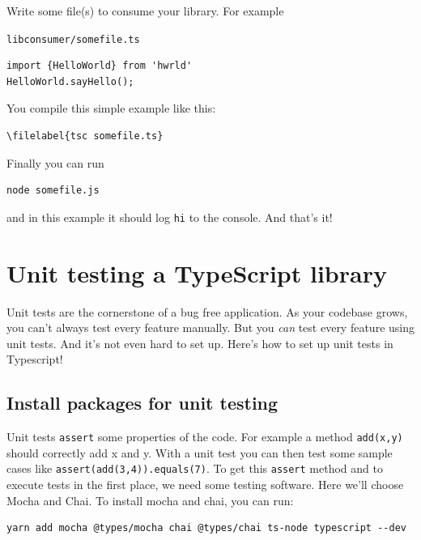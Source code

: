 \documentclass[12pt,a4paper]{article}
\newcommand{\filelabel}[1]{{\footnotesize\color{dkgreen}\texttt{#1}}{\vspace{-0.2cm}}}
\begin{document}
Write some file(s) to consume your library. For example

\filelabel{libconsumer/somefile.ts}

\begin{lstlisting}
import {HelloWorld} from 'hwrld'
HelloWorld.sayHello();
\end{lstlisting}

You compile this simple example like this:

\begin{lstlisting}
\filelabel{tsc somefile.ts}
\end{lstlisting}

Finally you can run

\begin{lstlisting}
node somefile.js
\end{lstlisting}

and in this example it should log \texttt{hi} to the console. And that's
it!


\section{Unit testing a TypeScript
library}\label{unit-testing-a-typescript-library}

Unit tests are the cornerstone of a bug free application. As your
codebase grows, you can't always test every feature manually. But you
\emph{can} test every feature using unit tests. And it's not even hard
to set up. Here's how to set up unit tests in Typescript!

\subsection{\texorpdfstring{ Install packages for unit
testing}{Install packages for unit testing}}\label{step-1-install-packages-for-unit-testing}

Unit tests \texttt{assert} some properties of the code. For example a
method \texttt{add(x,y)} should correctly add x and y. With a unit test
you can then test some sample cases like
\texttt{assert(add(3,4)).equals(7)}. To get this \texttt{assert} method
and to execute tests in the first place, we need some testing software.
Here we'll choose Mocha and Chai. To install mocha and chai, you can
run:

\begin{lstlisting}
yarn add mocha @types/mocha chai @types/chai ts-node typescript --dev
\end{lstlisting}
\end{document}
